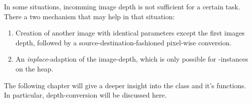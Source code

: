 In some situations, incomming image depth is not sufficient for a certain task. There a two mechanism that may help in that situation:
\begin{enumerate}
\item Creation of another image with identical parameters except the first images depth, followed by a source-destination-fashioned pixel-wise conversion.
\item An \emph{inplace}-adaption of the image-depth, which is only possible for -instances on the heap.
\end{enumerate}


The following chapter will give a deeper insight into the  class and it's functions. In particular, depth-conversion will be discussed here.


